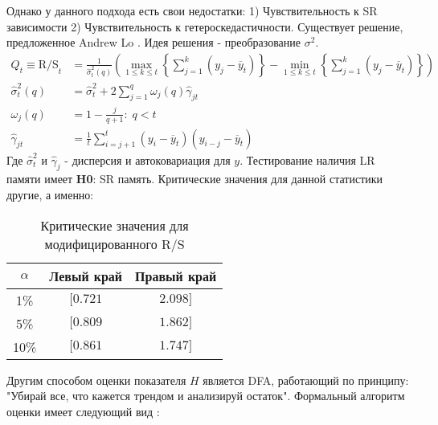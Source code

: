 Однако у данного подхода есть свои недостатки: 1) Чувствительность к SR зависимости 2) Чувствительность к гетероскедастичности. Существует решение, предложенное Andrew Lo \cite{andrew1991longterm}. Идея решения - преобразование $\sigma^2$.
\begin{equation}
	\begin{split}
		Q_t \equiv \text{R/S}_t & = \frac{1}{\hat{\sigma}^2_t(q)} \left(\max_{1 \le k \le t} \left\{\sum_{j = 1}^k (y_j - \overline{y}_t)\right\} - \min_{1 \le k \le t} \left\{\sum_{j = 1}^k (y_j - \overline{y}_t)\right\}\right)\\
		\hat{\sigma}^2_t(q) & = \hat{\sigma}^2_t + 2 \sum_{j = 1}^q \omega_j(q) \hat{\gamma}_{jt}\\
		\omega_j(q) & = 1 - \frac{j}{q + 1}: \; q < t\\
		\hat{\gamma}_{jt} & = \frac{1}{t} \sum_{i = j + 1}^t (y_i - \overline{y}_t)(y_{i - j} - \overline{y}_t)
	\end{split}
\end{equation}
Где $\hat{\sigma}^2_t$ и $\hat{\gamma}_j$ - дисперсия и автоковариация для $y$. Тестирование наличия LR памяти имеет \textbf{H0}: SR память. Критические значения для данной статистики другие, а именно:
\begin{table}[H]
	\centering
	\begin{tabular}{c|cc}
		\toprule
		$\alpha$ & Левый край & Правый край\\
		\midrule[0.02cm]
		1\% & $[0.721$ & $2.098]$\\
		5\% & $[0.809$ & $1.862]$\\
		10\% & $[0.861$ & $1.747]$\\
		\midrule[0.02cm]
	\end{tabular}
	\caption{Критические значения для модифицированного R/S}
\end{table}
\noindent Другим способом оценки показателя $H$ является DFA, работающий по принципу: "Убирай все, что кажется трендом и анализируй остаток". Формальный алгоритм оценки имеет следующий вид \cite{garafutdinov2021research}:
